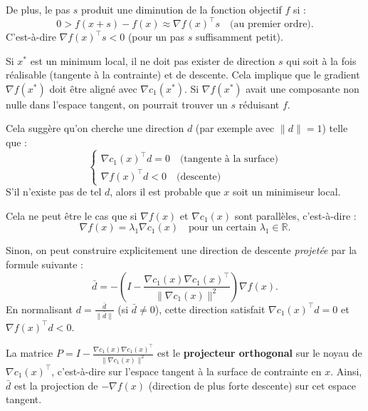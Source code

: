 De plus, le pas $s$ produit une diminution de la fonction objectif $f$ si :
\begin{equation}
    0 > f(x+s) - f(x) \approx \nabla f(x)^\top s \quad \text{(au premier ordre)}.
\end{equation}
C'est-à-dire $\nabla f(x)^\top s < 0$ (pour un pas $s$ suffisamment petit).

Si $x^*$ est un minimum local, il ne doit pas exister de direction $s$ qui soit à la fois réalisable (tangente à la contrainte) et de descente. Cela implique que le gradient $\nabla f(x^*)$ doit être aligné avec $\nabla c_1(x^*)$. Si $\nabla f(x^*)$ avait une composante non nulle dans l'espace tangent, on pourrait trouver un $s$ réduisant $f$.

Cela suggère qu'on cherche une direction $d$ (par exemple avec $\|d\|=1$) telle que :
\begin{equation}
    \begin{cases}
    \nabla c_1(x)^\top d = 0 \quad \text{(tangente à la surface)} \\
    \nabla f(x)^\top d < 0 \quad \text{(descente)}
    \end{cases}
\end{equation}
S'il n'existe pas de tel $d$, alors il est probable que $x$ soit un minimiseur local.

Cela ne peut être le cas que si $\nabla f(x)$ et $\nabla c_1(x)$ sont parallèles, c'est-à-dire :
\begin{equation}
    \nabla f(x) = \lambda_1 \nabla c_1(x) \quad \text{pour un certain } \lambda_1 \in \mathbb{R}.
\end{equation}

Sinon, on peut construire explicitement une direction de descente \textit{projetée} par la formule suivante :
\begin{equation}
    \bar{d} = - \left( I - \frac{\nabla c_1(x) \nabla c_1(x)^\top}{\|\nabla c_1(x)\|^2} \right) \nabla f(x).
\end{equation}
En normalisant $d = \frac{\bar{d}}{\|\bar{d}\|}$ (si $\bar{d} \neq 0$), cette direction satisfait $\nabla c_1(x)^\top d = 0$ et $\nabla f(x)^\top d < 0$.

\begin{remarque}
La matrice $P = I - \frac{\nabla c_1(x) \nabla c_1(x)^\top}{\|\nabla c_1(x)\|^2}$ est le \textbf{projecteur orthogonal} sur le noyau de $\nabla c_1(x)^\top$, c'est-à-dire sur l'espace tangent à la surface de contrainte en $x$. Ainsi, $\bar{d}$ est la projection de $-\nabla f(x)$ (direction de plus forte descente) sur cet espace tangent.
\end{remarque}

